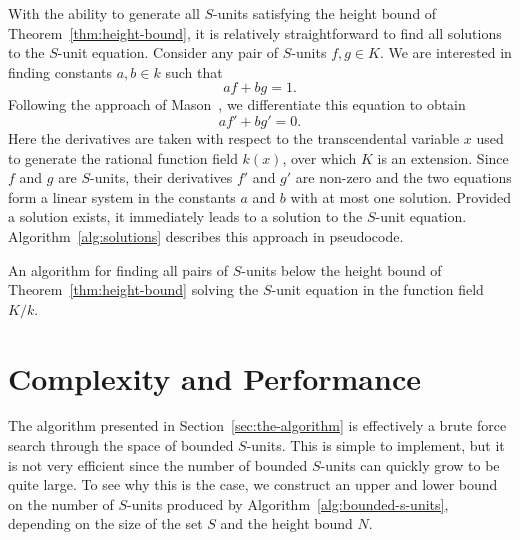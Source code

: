 With the ability to generate all \(S\)-units satisfying the height bound of Theorem~\ref{thm:height-bound}, it is relatively straightforward to find all solutions to the \(S\)-unit equation. Consider any pair of \(S\)-units \(f, g \in K\). We are interested in finding constants \(a, b \in k\) such that
\[af + bg = 1.\]
Following the approach of Mason~\cite{mason-1984-diophantine-equations-over}, we differentiate this equation to obtain
\[af' + bg' = 0.\]
Here the derivatives are taken with respect to the transcendental variable \(x\) used to generate the rational function field \(k(x)\), over which \(K\) is an extension. Since \(f\) and \(g\) are \(S\)-units, their derivatives \(f'\) and \(g'\) are non-zero and the two equations form a linear system in the constants \(a\) and \(b\) with at most one solution. Provided a solution exists, it immediately leads to a solution to the \(S\)-unit equation. Algorithm~\ref{alg:solutions} describes this approach in pseudocode.

\begin{algorithm}[htb]
  \caption{An algorithm for finding all pairs of \(S\)-units below the height bound of Theorem~\ref{thm:height-bound} solving the \(S\)-unit equation in the function field \(K / k\).}%
  \label{alg:solutions}
  \begin{algorithmic}[]
     
     
     
     
    \EndIf{}
    \EndIf{}
    \EndFor{}
    \EndFor{}
    \EndFunction{}
  \end{algorithmic}
\end{algorithm}

\section{Complexity and Performance}%
\label{sec:complexity-and-performance}

The algorithm presented in Section~\ref{sec:the-algorithm} is effectively a brute force search through the space of bounded \(S\)-units. This is simple to implement, but it is not very efficient since the number of bounded \(S\)-units can quickly grow to be quite large. To see why this is the case, we construct an upper and lower bound on the number of \(S\)-units produced by Algorithm~\ref{alg:bounded-s-units}, depending on the size of the set \(S\) and the height bound \(N\).

